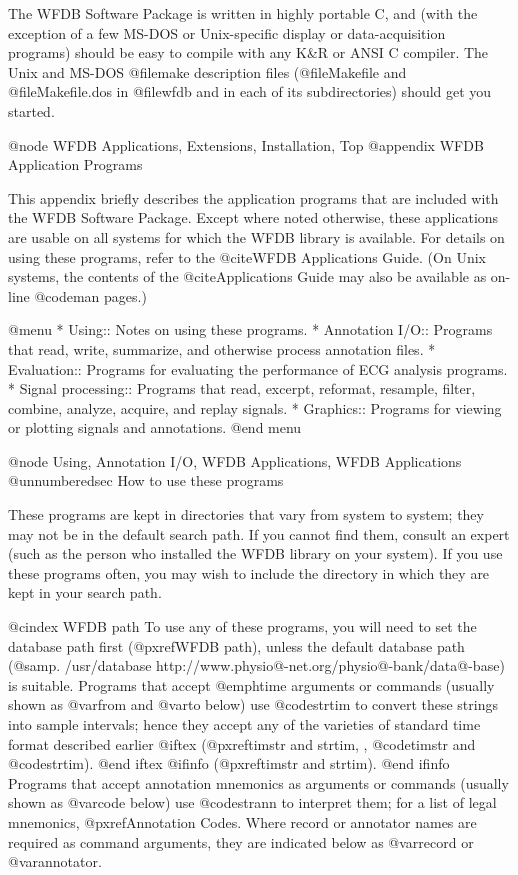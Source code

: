 {{{{{{{{{The WFDB Software Package is written in highly portable C, and (with the
exception of a few MS-DOS or Unix-specific display or data-acquisition
programs) should be easy to compile with any K&R or ANSI C compiler.
The Unix and MS-DOS @file{make} description files (@file{Makefile}
and @file{Makefile.dos} in @file{wfdb} and in each of its subdirectories)
should get you started.

@node     WFDB Applications, Extensions, Installation, Top
@appendix WFDB Application Programs

This appendix briefly describes the application programs that are
included with the WFDB Software Package.  Except where noted otherwise,
these applications are usable on all systems for which the WFDB library is
available.  For details on using these programs, refer to the @cite{WFDB
Applications Guide}.  (On Unix systems, the contents of the
@cite{Applications Guide} may also be available as on-line @code{man}
pages.)

@menu
* Using::		Notes on using these programs.
* Annotation I/O::	Programs that read, write, summarize, and
			otherwise process annotation files.
* Evaluation::		Programs for evaluating the performance of ECG
			analysis programs.
* Signal processing::	Programs that read, excerpt, reformat, resample,
			filter, combine, analyze, acquire, and replay signals.
* Graphics::		Programs for viewing or plotting signals and
			annotations.
@end menu

@node     Using, Annotation I/O, WFDB Applications, WFDB Applications
@unnumberedsec How to use these programs

These programs are kept in directories that vary from system to system;
they may not be in the default search path.  If you cannot find them,
consult an expert (such as the person who installed the WFDB library on
your system).  If you use these programs often, you may wish to include
the directory in which they are kept in your search path.

@cindex WFDB path
To use any of these programs, you will need to set the database path first
(@pxref{WFDB path}), unless the default database path
(@samp{. /usr/database http://www.physio@-net.org/physio@-bank/data@-base})
is suitable. Programs that accept @emph{time} arguments or commands (usually
shown as @var{from} and @var{to} below) use @code{strtim} to convert these
strings into sample intervals; hence they accept any of the varieties of
standard time format described earlier
@iftex
(@pxref{timstr and strtim, , @code{timstr} and @code{strtim}}).
@end iftex
@ifinfo
(@pxref{timstr and strtim}).
@end ifinfo
Programs that accept annotation mnemonics as arguments or commands
(usually shown as @var{code} below) use @code{strann} to interpret them;
for a list of legal mnemonics, @pxref{Annotation Codes}.  Where record
or annotator names are required as command arguments, they are indicated
below as @var{record} or @var{annotator}.

}}}}}}}}}
